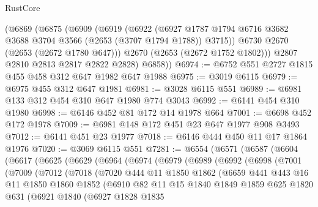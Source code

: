 \begin{lexlean}{RustCore}
\begin{coremodule}
      (@6869
        (@6875
          (@6909
            (@6919
              (@6922
                (@6927 @1787 @1794 @6716 @3682 @3688 @3704 @3566 (@2653 (@3707 @1794 @1788)) @3715))
              @6730
              @2670
              (@2653 (@2672 @1780 @647)))
            @2670
            (@2653 (@2672 @1752 @1802)))
          @2807
          @2810
          @2813
          @2817
          @2822
          @2828)
        @6858))
@6974 := @6752 @551 @2727 @1815 @455 @458 @312 @647 @1982 @647 @1988
@6975 := @3019 @6115
@6979 := @6975 @455 @312 @647 @1981
@6981 := @3028 @6115 @551
@6989 := @6981 @133 @312 @454 @310 @647 @1980 @774 @3043
@6992 := @6141 @454 @310 @1980
@6998 := @6146 @452 @81 @172 @14 @1978 @664
@7001 := @6698 @452 @172 @1978
@7009 := @6981 @148 @172 @451 @23 @647 @1977 @908 @3493
@7012 := @6141 @451 @23 @1977
@7018 := @6146 @444 @450 @11 @17 @1864 @1976
@7020 := @3069 @6115 @551
@7281 := @6554
    (@6571
      (@6587
        (@6604
          (@6617
            (@6625
              (@6629
                (@6964
                  (@6974
                    (@6979
                      (@6989
                        (@6992
                          (@6998
                            (@7001
                              (@7009
                                (@7012
                                  (@7018
                                    (@7020
                                      @444
                                      @11
                                      @1850
                                      @1862
                                      (@6659
                                        @441
                                        @443
                                        @16
                                        @11
                                        @1850
                                        @1860
                                        @1852
                                        (@6910
                                          @82
                                          @11
                                          @15
                                          @1840
                                          @1849
                                          @1859
                                          @625
                                          @1820
                                          @631
                                          (@6921
                                            @1840
                                            (@6927
                                              @1828
                                              @1835

\end{coremodule}
\end{lexlean}
